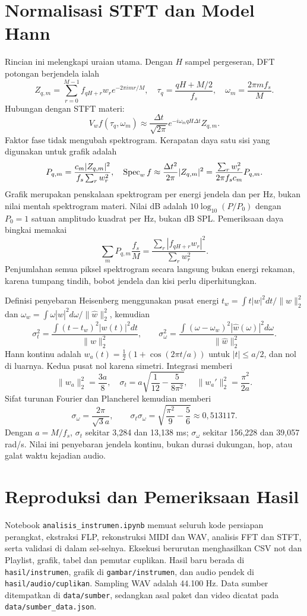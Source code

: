 \appendix
\section{Normalisasi STFT dan Model Hann}\label{app:normalisasi}
Rincian ini melengkapi uraian utama. Dengan $H$ sampel pergeseran,
DFT potongan berjendela ialah
\[
 Z_{q,m}=\sum_{r=0}^{M-1}f_{qH+r}w_r e^{-2\pi i mr/M},\quad
 \tau_q=\frac{qH+M/2}{f_s},\quad \omega_m=\frac{2\pi mf_s}{M}.
\]
Hubungan dengan STFT materi:
\[
 V_wf(\tau_q,\omega_m)\approx\frac{\Delta t}{\sqrt{2\pi}}
 e^{-i\omega_mqH\Delta t}Z_{q,m}.
\]
Faktor fase tidak mengubah spektrogram. Kerapatan daya satu sisi
yang digunakan untuk grafik adalah
\[
 P_{q,m}=\frac{c_m|Z_{q,m}|^2}{f_s\sum_rw_r^2},\quad
 \operatorname{Spec}_wf\approx\frac{\Delta t^2}{2\pi}|Z_{q,m}|^2
 =\frac{\sum_rw_r^2}{2\pi f_sc_m}P_{q,m}.
\]
Grafik merupakan penskalaan spektrogram per energi jendela dan per
Hz, bukan nilai mentah spektrogram materi. Nilai dB adalah
$10\log_{10}(P/P_0)$ dengan $P_0=1$ satuan amplitudo kuadrat per Hz,
bukan dB SPL. Pemeriksaan daya bingkai memakai
\[
 \sum_mP_{q,m}\frac{f_s}{M}
 =\frac{\sum_r|f_{qH+r}w_r|^2}{\sum_rw_r^2}.
\]
Penjumlahan semua piksel spektrogram secara langsung bukan energi
rekaman, karena tumpang tindih, bobot jendela dan kisi perlu
diperhitungkan.

Definisi penyebaran Heisenberg menggunakan pusat energi
$t_w=\int t|w|^2dt/\|w\|_2^2$ dan
$\omega_w=\int\omega|\widehat w|^2d\omega/\|\widehat w\|_2^2$, kemudian
\[
 \sigma_t^2=\frac{\int(t-t_w)^2|w(t)|^2dt}{\|w\|_2^2},\qquad
 \sigma_\omega^2=\frac{\int(\omega-\omega_w)^2|\widehat w(\omega)|^2d\omega}{\|\widehat w\|_2^2}.
\]
Hann kontinu adalah $w_a(t)=\frac12(1+\cos(2\pi t/a))$ untuk
$|t|\leq a/2$, dan nol di luarnya. Kedua pusat nol karena simetri.
Integrasi memberi
\[
 \|w_a\|_2^2=\frac{3a}{8},\quad
 \sigma_t=a\sqrt{\frac1{12}-\frac5{8\pi^2}},\quad
 \|w_a'\|_2^2=\frac{\pi^2}{2a}.
\]
Sifat turunan Fourier dan Plancherel kemudian memberi
\[
 \sigma_\omega=\frac{2\pi}{\sqrt3a},\qquad
 \sigma_t\sigma_\omega=\sqrt{\frac{\pi^2}{9}-\frac56}
 \approx0{,}513117.
\]
Dengan $a=M/f_s$, $\sigma_t$ sekitar 3,284 dan 13,138 ms;
$\sigma_\omega$ sekitar 156,228 dan 39,057 rad/s. Nilai ini
penyebaran jendela kontinu, bukan durasi dukungan, hop, atau galat
waktu kejadian audio.

\section{Reproduksi dan Pemeriksaan Hasil}
Notebook \texttt{analisis\_instrumen.ipynb} memuat seluruh kode
persiapan perangkat, ekstraksi FLP, rekonstruksi MIDI dan WAV,
analisis FFT dan STFT, serta validasi di dalam sel-selnya.
Eksekusi berurutan menghasilkan CSV not dan Playlist,
grafik, tabel dan pemutar cuplikan. Hasil baru berada di
\texttt{hasil/instrumen}, grafik di \texttt{gambar/instrumen},
dan audio pendek di \texttt{hasil/audio/cuplikan}. Sampling WAV adalah
44.100 Hz. Data sumber ditempatkan di \texttt{data/sumber}, sedangkan
asal paket dan video dicatat pada \texttt{data/sumber\_data.json}.

